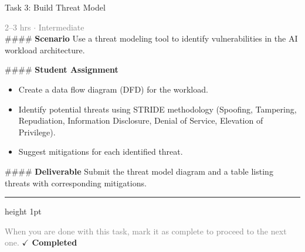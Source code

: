 \documentclass[10pt,a4paper]{article}
\begin{document}
\begin{taskbox}{Task 3: Build Threat Model}

    {\small \textcolor{gray}{2--3 hrs $\cdot$ Intermediate}}\\[12pt]

    \#\#\#\# \textbf{Scenario}
Use a threat modeling tool to identify vulnerabilities in the AI workload architecture.

\#\#\#\# \textbf{Student Assignment}
\begin{itemize}
    \item Create a data flow diagram (DFD) for the workload.
    \item Identify potential threats using STRIDE methodology (Spoofing, Tampering, Repudiation, Information Disclosure, Denial of Service, Elevation of Privilege).
    \item Suggest mitigations for each identified threat.
\end{itemize}

\#\#\#\# \textbf{Deliverable}
Submit the threat model diagram and a table listing threats with corresponding mitigations.\par

    \vspace{16pt}

    \textcolor{cardBorder}{\hrule height 1pt}\vspace{8pt}

    \small \textcolor{gray}{When you are done with this task, mark it as complete to proceed to the next one.} \hfill \textbf{\textcolor{brandDark}{$\checkmark$ Completed}}

\end{taskbox}
\end{document}
